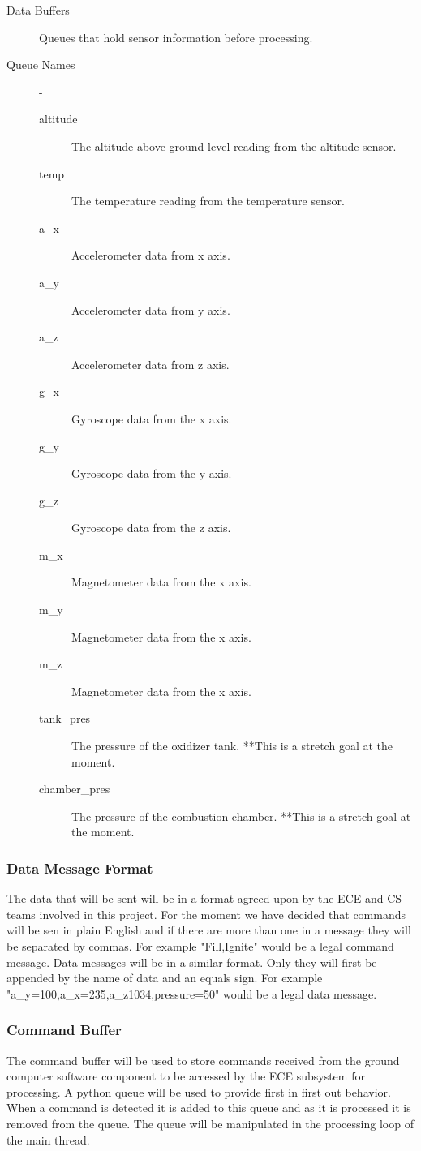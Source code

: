 \documentclass[10pt,draftclsnofoot,onecolumn,compsoc]{IEEEtran}
\begin{document}
\begin{description}
	\item[Data Buffers] Queues that hold sensor information before processing.
	\item[Queue Names]  -
		\begin{description}
			\item[altitude] The altitude above ground level reading from the altitude sensor.
			\item[temp] The temperature reading from the temperature sensor.
			\item[a\_x] Accelerometer data from x axis.
			\item[a\_y] Accelerometer data from y axis.
			\item[a\_z] Accelerometer data from z axis.
			\item[g\_x] Gyroscope data from the x axis.
			\item[g\_y] Gyroscope data from the y axis.
			\item[g\_z] Gyroscope data from the z axis.
			\item[m\_x] Magnetometer data from the x axis.
			\item[m\_y] Magnetometer data from the x axis.
			\item[m\_z] Magnetometer data from the x axis.
			\item[tank\_pres] The pressure of the oxidizer tank. **This is a stretch goal at the moment.
			\item[chamber\_pres] The pressure of the combustion chamber. **This is a stretch goal at the moment.
		\end{description}
\end{description}
\subsubsection{Data Message Format}
The data that will be sent will be in a format agreed upon by the ECE and CS teams involved in this project. For the moment we have decided that commands will be sen in plain English and if there are more than one in a message they will be separated by commas. For example "Fill,Ignite" would be a legal command message. Data messages will be in a similar format. Only they will first be appended by the name of data and an equals sign. For example "a\_y=100,a\_x=235,a\_z1034,pressure=50" would be a legal data message.

\subsubsection{Command Buffer}
The command buffer will be used to store commands received from the ground computer software component to be accessed by the ECE subsystem for processing. A python queue will be used to provide first in first out behavior. When a command is detected it is added to this queue and as it is processed it is removed from the queue. The queue will be manipulated in the processing loop of the main thread.\par
 
\end{document}
